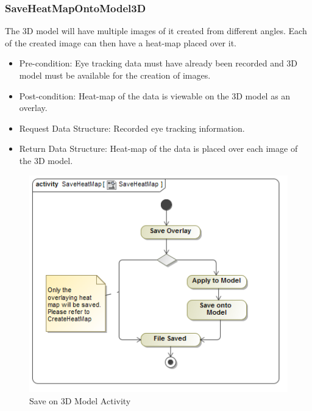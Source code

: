 	\subsubsection{SaveHeatMapOntoModel3D}
	The 3D model will have multiple images of it created from different angles. Each of the created image can then have a heat-map placed over it.
	\begin{itemize}
		\item Pre-condition: Eye tracking data must have already been recorded and 3D model must be available for the creation of images.
		\item Post-condition: Heat-map of the data is viewable on the 3D model as an overlay.
		\item Request Data Structure: Recorded eye tracking information.
		\item Return Data Structure: Heat-map of the data is placed over each image of the 3D model.
	\end{itemize}
	\begin{figure}[!ht]
		\centering	
		\includegraphics[scale=0.5,width=15cm,keepaspectratio]{Diagrams/Activity_Diagram__SaveHeatMap__SaveHeatMap.png}	
		\caption{Save on 3D Model Activity}
	\end{figure}
	
